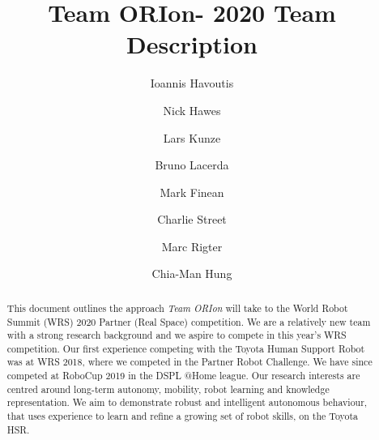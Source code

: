\documentclass[runningheads,a4paper]{llncs}
\newcommand{\teamori}{Team ORIon}
\begin{document}

\title{\teamori - 2020 Team Description}

\author{Ioannis Havoutis \and Nick Hawes \and Lars Kunze \and Bruno Lacerda 
\and Mark Finean \and Charlie Street \and Marc Rigter \and Chia-Man Hung}

\maketitle


\begin{abstract}
This document outlines the approach \textit{\teamori} will take to the 
World Robot Summit (WRS) 2020 Partner (Real Space) competition. 
We are a relatively new team with a strong research background and we aspire to compete 
in this year's WRS competition. Our first experience competing with the Toyota Human 
Support Robot was at WRS 2018, where we competed in the Partner 
Robot Challenge. We have since competed at RoboCup 2019 in the DSPL @Home league.
Our research interests are centred around long-term
autonomy, mobility, robot learning and knowledge representation. 
We aim to demonstrate robust and intelligent autonomous behaviour, that uses
experience to learn and refine a growing set of robot skills, on the Toyota
HSR.
\end{abstract}


\end{document}
